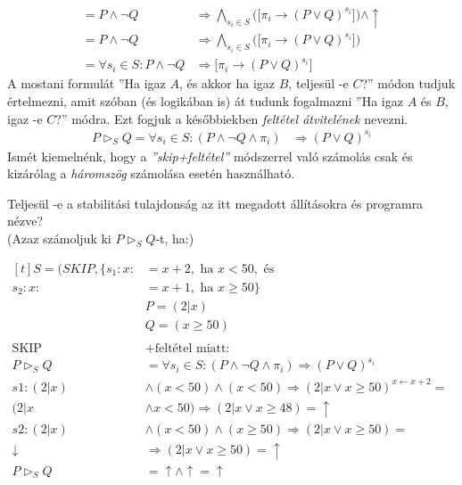 \documentclass[12pt]{article}
\newcommand{\haromszog}[2]{$#1 \vartriangleright_S #2$}
\begin{document}
    \begin{align*}
        = P \land \neg Q &\Rightarrow \bigwedge_{s_i \in S}  \big(\big[\pi_i \rightarrow (P \lor Q)^{s_i}\big]\big) \land \uparrow\\
        = P \land \neg Q &\Rightarrow \bigwedge_{s_i \in S}  \big(\big[\pi_i \rightarrow (P \lor Q)^{s_i}\big]\big)\\
        = \forall s_i \in S: P \land \neg Q &\Rightarrow\big[\pi_i \rightarrow (P \lor Q)^{s_i}\big]
    \end{align*}
    A mostani formulát ''Ha igaz $A$, és akkor ha igaz $B$, teljesül -e $C$?'' módon tudjuk értelmezni, amit szóban (és logikában is) át tudunk fogalmazni ''Ha igaz $A$ és $B$, igaz -e $C$?'' módra. Ezt fogjuk a későbbiekben \textit{feltétel átvitelének} nevezni.
    \begin{align*}
        P \vartriangleright_S Q = \forall s_i \in S: (P \land \neg Q \land \pi_i) &\Rightarrow (P \lor Q)^{s_i}
    \end{align*}
Ismét kiemelnénk, hogy a \textit{''skip+feltétel''} módszerrel való számolás csak és kizárólag a \textit{háromszög} számolása esetén használható.

Teljesül -e a stabilitási tulajdonság az itt megadott állításokra és programra nézve?\\
(Azaz számoljuk ki \haromszog{P}{Q}-t, ha:)\\
\par
$
\begin{aligned}[t]
S = (SKIP, \{s_1: x :&= x+2, \text{ ha } x<50, \text{ és}\\
s_2: x :&= x+1, \text{ ha } x\ge 50 \}\\
&P = (2|x)\\
&Q = (x\ge50)\\
 \\
\text{SKIP} &+ \text{feltétel miatt: }\\
P \vartriangleright_S Q &=\forall s_i \in S: (P \land \neg Q \land \pi_i) \Rightarrow (P \lor Q)^{s_i}\\
s1: (2|x) &\land (x<50) \land (x<50) \Rightarrow (2|x \lor x\ge50)^{x \leftarrow x+2} = \\
(2|x &\land x<50) \Rightarrow (2|x \lor x\ge 48) = \uparrow \\
s2: (2|x) &\land (x<50) \land (x\ge50) \Rightarrow (2|x \lor x\ge50) = \\
\downarrow &\Rightarrow (2|x \lor x\ge50) = \uparrow\\
P \vartriangleright_S Q &= \uparrow \land \uparrow = \uparrow
\end{aligned}
$
\end{document}
